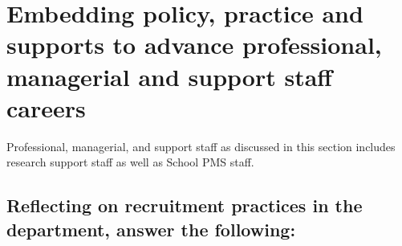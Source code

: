 
\newpage 
\section{Embedding policy, practice and supports to advance professional, managerial and support staff careers}
\label{sec:pms}

Professional, managerial, and support staff as discussed in this section includes research support staff as well as School PMS staff.

\subsection{Reflecting on recruitment practices in the department, answer the following:}






